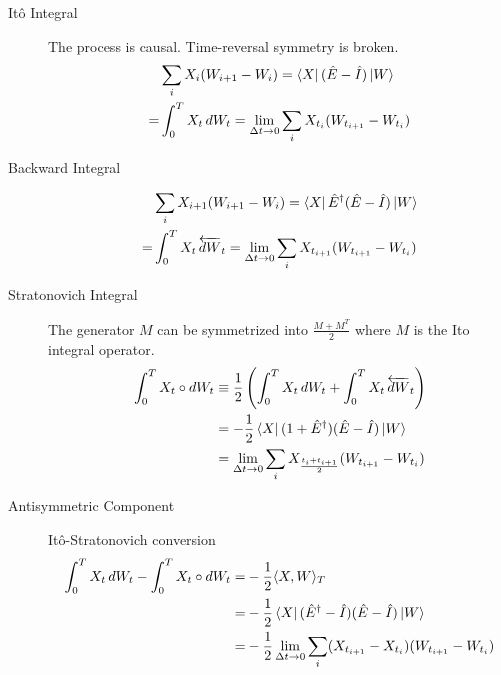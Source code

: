 \documentclass{article}
\begin{document}
\begin{description}
    \item[It\^o Integral] The process is causal. Time-reversal symmetry is broken.
          \begin{align*}
                & \sum_i X_i (W_{i+1}- W_i)= \bra{X} (\hat{E} - \hat{I}) \ket{W}                        \\
              = & \int_0^T X_t \, dW_t = \lim_{\Delta t \to 0} \sum_{i} X_{t_i} (W_{t_{i+1}} - W_{t_i})
          \end{align*}
    \item[Backward Integral]
          \begin{align*}
                & \sum_i X_{i+1} (W_{i+1}- W_i)= \bra{X} \hat{E}^{\dagger} (\hat{E}- \hat{I}) \ket{W}                       \\
              = & \int_0^T X_t \, \overleftarrow{dW}_t = \lim_{\Delta t \to 0} \sum_{i} X_{t_{i+1}} (W_{t_{i+1}} - W_{t_i})
          \end{align*}
    \item[Stratonovich Integral]
          The generator $M$ can be symmetrized into $\frac{M+M^T}{2}$ where $M$ is the Ito integral operator.
          \begin{align*}
              \int_0^T X_t \circ dW_t & \equiv \frac{1}{2} \left( \int_0^T X_t \, dW_t + \int_0^T X_t \, \overleftarrow{dW}_t \right)                                \\
                                      & =                                                 - \frac{1}{2} \bra{X} ( 1 + \hat{E}^{\dagger}) (\hat{E} - \hat{I}) \ket{W} \\
                                      & = \lim_{\Delta t \to 0} \sum_{i} X_{\frac{t_i + t_{i+1}}{2}} (W_{t_{i+1}} - W_{t_i})
          \end{align*}
    \item[Antisymmetric Component]
          It\^o-Stratonovich conversion
          \begin{align*}
              \int_0^T X_t \, dW_t - \int_0^T X_t \circ dW_t = & - \frac{1}{2} \langle X, W \rangle_T                                                         \\
              =                                                & - \frac{1}{2} \bra{X} (\hat{E}^\dagger - \hat{I}) (\hat{E} - \hat{I}) \ket{W}                \\
              =                                                & - \frac{1}{2} \lim_{\Delta t \to 0} \sum_{i} (X_{t_{i+1}} - X_{t_i}) (W_{t_{i+1}} - W_{t_i})
          \end{align*}

\end{description}
\end{document}
